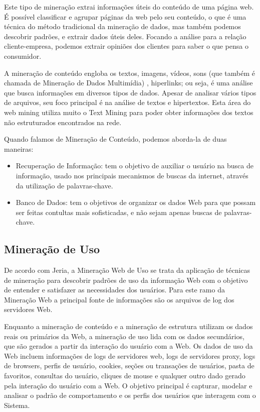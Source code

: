 	Este tipo de mineração extrai informações úteis do conteúdo de uma página web. É possível classificar e agrupar páginas da web pelo seu conteúdo, o que é uma técnica do método tradicional da mineração de dados, mas também podemos descobrir padrões, e extrair dados úteis deles. Focando a análise para a relação cliente-empresa, podemos extrair opiniões dos clientes para saber o que pensa o consumidor.

	A mineração de conteúdo engloba os textos, imagens, vídeos, sons (que também é chamada de Mineração de Dados Multimídia) , hiperlinks; ou seja, é uma análise que busca informações em diversos tipos de dados.  Apesar de analisar vários tipos de arquivos, seu foco principal é na análise de textos e hipertextos. Esta área do web mining utiliza muito o Text Mining para poder obter informações dos textos não estruturados encontrados na rede.

	Quando falamos de Mineração de Conteúdo, podemos aborda-la de duas maneiras:

\begin{itemize}
\item 	Recuperação de Informação: tem o objetivo de auxiliar o usuário na busca de informação, usado nos principais mecanismos de buscas da internet, através da utilização de palavras-chave.
\item 	Banco de Dados: tem o objetivos de organizar os dados Web para que possam ser feitas contultas mais sofisticadas, e não sejam apenas buscas de palavras-chave.
\end{itemize}

\subsection{Mineração de Uso}

    De acordo com Jeria\cite{Escobar}, a Mineração Web de Uso se trata da aplicação de técnicas de mineração para descobrir padrões de uso da informação Web com o objetivo de entender e satisfazer as necessidades dos usuários. Para este ramo da Mineração Web a principal fonte de informações são os arquivos de log dos servidores Web.

	Enquanto a mineração de conteúdo e a mineração de estrutura utilizam os dados reais ou primários da Web, a mineração de uso lida com os dados secundários, que são gerados a partir da interação do usuário com a Web. Os dados de uso da Web incluem informações de logs de servidores web, logs de servidores proxy, logs de browsers, perfis de usuário, cookies, seções ou transações de usuários, pasta de favoritos, consultas do usuário, cliques de mouse e qualquer outro dado gerado pela interação do usuário com a Web.\cite{Girardi} O objetivo principal é capturar, modelar e analisar o padrão de comportamento e os perfis dos usuários que interagem com o Sistema.

